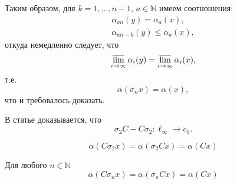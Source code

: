 Таким образом, для $k=1, ..., n-1$, $a\in\mathbb{N}$ имеем соотношения:
\begin{gather}
	\alpha_{an}(y) = \alpha_a(x),
\\
	\alpha_{an-k}(y) \leqslant \alpha_a(x),
\end{gather}
откуда немедленно следует, что
\begin{equation}
	\varlimsup_{i\to\infty} \alpha_i(y) =
	\varlimsup_{i\to\infty} \alpha_i(x),
\end{equation}
т.е.
\begin{equation}
	\alpha(\sigma_n x) = \alpha(x),
\end{equation}
что и требовалось доказать.

В статье \cite[lemma 16]{Semenov2010invariant} доказывается, что
\begin{equation}
	\sigma_2 C - C \sigma_2 : \ell_\infty \to c_0
	.
\end{equation}

\begin{corollary}
	$$
		\alpha(C\sigma_2 x) =
		\alpha(\sigma_2 Cx) =
		\alpha(Cx)
	$$
\end{corollary}

\begin{hypothesis}
	Для любого $n\in\mathbb{N}$
	$$
		\alpha(C\sigma_n x) =
		\alpha(\sigma_n Cx) =
		\alpha(Cx)
	$$
\end{hypothesis}
